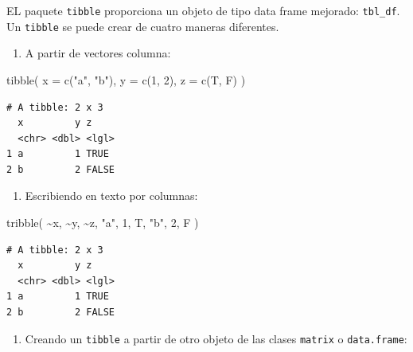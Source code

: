 \documentclass[
  letterpaper,
  DIV=11,
  numbers=noendperiod]{scrreprt}
\newenvironment{Shaded}{\begin{snugshade}}{\end{snugshade}}
\newcommand{\AttributeTok}[1]{\textcolor[rgb]{0.40,0.45,0.13}{#1}}
\newcommand{\DecValTok}[1]{\textcolor[rgb]{0.68,0.00,0.00}{#1}}
\newcommand{\FunctionTok}[1]{\textcolor[rgb]{0.28,0.35,0.67}{#1}}
\newcommand{\NormalTok}[1]{\textcolor[rgb]{0.00,0.23,0.31}{#1}}
\newcommand{\SpecialCharTok}[1]{\textcolor[rgb]{0.37,0.37,0.37}{#1}}
\newcommand{\StringTok}[1]{\textcolor[rgb]{0.13,0.47,0.30}{#1}}
\providecommand{\tightlist}{%
  \setlength{\itemsep}{0pt}\setlength{\parskip}{0pt}}\usepackage{longtable,booktabs,array}
\begin{document}
EL paquete \texttt{tibble} proporciona un objeto de tipo data frame
mejorado: \texttt{tbl\_df}. Un \texttt{tibble} se puede crear de cuatro
maneras diferentes.

\begin{enumerate}
\def\labelenumi{\alph{enumi}.}
\tightlist
\item
  A partir de vectores columna:
\end{enumerate}

\begin{Shaded}
\begin{Highlighting}[]
\FunctionTok{tibble}\NormalTok{(}
  \AttributeTok{x =} \FunctionTok{c}\NormalTok{(}\StringTok{"a"}\NormalTok{, }\StringTok{"b"}\NormalTok{),}
  \AttributeTok{y =} \FunctionTok{c}\NormalTok{(}\DecValTok{1}\NormalTok{, }\DecValTok{2}\NormalTok{),}
  \AttributeTok{z =} \FunctionTok{c}\NormalTok{(T, F)}
\NormalTok{)}
\end{Highlighting}
\end{Shaded}

\begin{verbatim}
# A tibble: 2 x 3
  x         y z    
  <chr> <dbl> <lgl>
1 a         1 TRUE 
2 b         2 FALSE
\end{verbatim}

\begin{enumerate}
\def\labelenumi{\alph{enumi}.}
\setcounter{enumi}{1}
\tightlist
\item
  Escribiendo en texto por columnas:
\end{enumerate}

\begin{Shaded}
\begin{Highlighting}[]
\FunctionTok{tribble}\NormalTok{(}
  \SpecialCharTok{\textasciitilde{}}\NormalTok{x, }\SpecialCharTok{\textasciitilde{}}\NormalTok{y, }\SpecialCharTok{\textasciitilde{}}\NormalTok{z,}
  \StringTok{"a"}\NormalTok{, }\DecValTok{1}\NormalTok{, T,}
  \StringTok{"b"}\NormalTok{, }\DecValTok{2}\NormalTok{, F}
\NormalTok{)}
\end{Highlighting}
\end{Shaded}

\begin{verbatim}
# A tibble: 2 x 3
  x         y z    
  <chr> <dbl> <lgl>
1 a         1 TRUE 
2 b         2 FALSE
\end{verbatim}

\begin{enumerate}
\def\labelenumi{\alph{enumi}.}
\setcounter{enumi}{2}
\tightlist
\item
  Creando un \texttt{tibble} a partir de otro objeto de las clases
  \texttt{matrix} o \texttt{data.frame}:
\end{enumerate}
\end{document}
